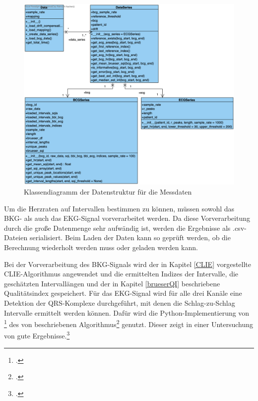 	\begin{figure}[H]
		\centering
		\includegraphics[width=\textwidth]{pic/data-prep-classes.png}
		\caption[Klassendiagramm der Datenstruktur für die Messdaten]{Klassendiagramm der Datenstruktur für die Messdaten}
		\label{fig:data-prep-class}
	\end{figure}
	
	Um die Herzraten auf Intervallen bestimmen zu können, müssen sowohl das \ac{BKG}- als auch das \ac{EKG}-Signal vorverarbeitet werden. Da diese Vorverarbeitung durch die große Datenmenge sehr aufwändig ist, werden die Ergebnisse als .csv-Dateien serialisiert. Beim Laden der Daten kann so geprüft werden, ob die Berechnung wiederholt werden muss oder geladen werden kann.
	
	Bei der Vorverarbeitung des \ac{BKG}-Signals wird der in Kapitel \ref{CLIE} vorgestellte CLIE-Algorithmus angewendet und die ermittelten Indizes der Intervalle, die geschätzten Intervallängen und der in Kapitel \ref{brueserQI} beschriebene Qualitätsindex gespeichert. Für das \ac{EKG}-Signal wird für alle drei Kanäle eine Detektion der QRS-Komplexe durchgeführt, mit denen die Schlag-zu-Schlag Intervalle ermittelt werden können. Dafür wird die Python-Implementierung von \citeauthor{Howell2019}\footcite{Howell2019} des von \citeauthor{Elgendi2010} beschriebenen Algorithmus\footcite[][]{Elgendi2010} genutzt. Dieser zeigt in einer Untersuchung von \citeauthor{Porr2019} gute Ergebnisse.\footcite{Porr2019}
	
